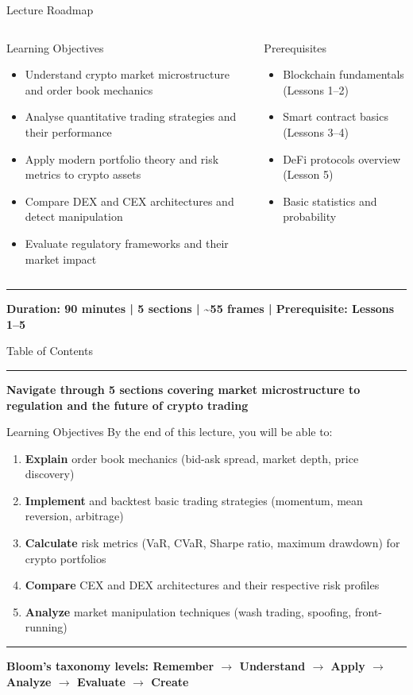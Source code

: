\documentclass[8pt,aspectratio=169]{beamer}
\newcommand{\bottomnote}[1]{\vfill\vspace{-2mm}\textcolor{mllavender2}{\rule{\textwidth}{0.4pt}}\vspace{1mm}\footnotesize\textbf{#1}}
\begin{document}
\begin{frame}{Lecture Roadmap}
\vspace{3mm}
\begin{columns}[T]
\begin{block}{Learning Objectives}
\begin{itemize}\setlength{\itemsep}{1pt}
  \item Understand crypto market microstructure and order book mechanics
  \item Analyse quantitative trading strategies and their performance
  \item Apply modern portfolio theory and risk metrics to crypto assets
  \item Compare DEX and CEX architectures and detect manipulation
  \item Evaluate regulatory frameworks and their market impact
\end{itemize}
\end{block}
\begin{block}{Prerequisites}
\begin{itemize}\setlength{\itemsep}{1pt}
  \item Blockchain fundamentals (Lessons 1--2)
  \item Smart contract basics (Lessons 3--4)
  \item DeFi protocols overview (Lesson 5)
  \item Basic statistics and probability
\end{itemize}
\end{block}
\end{columns}
\bottomnote{Duration: 90 minutes | 5 sections | \textasciitilde55 frames | Prerequisite: Lessons 1--5}
\end{frame}

\begin{frame}{Table of Contents}
\tableofcontents
\bottomnote{Navigate through 5 sections covering market microstructure to regulation and the future of crypto trading}
\end{frame}

\begin{frame}{Learning Objectives}
By the end of this lecture, you will be able to:
\begin{enumerate}
\item \textbf{Explain} order book mechanics (bid-ask spread, market depth, price discovery)
\item \textbf{Implement} and backtest basic trading strategies (momentum, mean reversion, arbitrage)
\item \textbf{Calculate} risk metrics (VaR, CVaR, Sharpe ratio, maximum drawdown) for crypto portfolios
\item \textbf{Compare} CEX and DEX architectures and their respective risk profiles
\item \textbf{Analyze} market manipulation techniques (wash trading, spoofing, front-running)
\end{enumerate}
\bottomnote{Bloom's taxonomy levels: Remember $\rightarrow$ Understand $\rightarrow$ Apply $\rightarrow$ Analyze $\rightarrow$ Evaluate $\rightarrow$ Create}
\end{frame}
\end{document}
